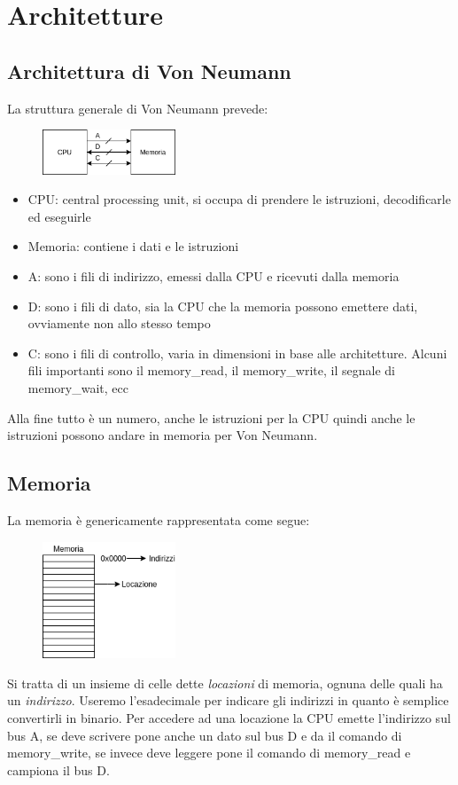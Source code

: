 \section{Architetture}

\subsection{Architettura di Von Neumann}
La struttura generale di Von Neumann prevede:

\begin{figure}[H]
    \centering
    \includegraphics[width=150px]{images/2_Architetture/Von_Neumann.png}
\end{figure}

\begin{itemize}
    \item CPU: central processing unit, si occupa di prendere le istruzioni, decodificarle ed eseguirle
    \item Memoria: contiene i dati e le istruzioni
    \item A: sono i fili di indirizzo, emessi dalla CPU e ricevuti dalla memoria
    \item D: sono i fili di dato, sia la CPU che la memoria possono emettere dati, ovviamente non allo stesso tempo
    \item C: sono i fili di controllo, varia in dimensioni in base alle architetture. Alcuni fili importanti sono il memory\_read, il memory\_write, il segnale di memory\_wait, ecc
\end{itemize}

Alla fine tutto è un numero, anche le istruzioni per la CPU quindi anche le istruzioni possono andare in memoria per Von Neumann.

\subsection{Memoria}
La memoria è genericamente rappresentata come segue:
\begin{figure}[H]
    \centering
    \includegraphics[width=150px]{images/2_Architetture/Memoria.png}
\end{figure}
Si tratta di un insieme di celle dette \emph{locazioni} di memoria, ognuna delle quali ha un \emph{indirizzo}.
Useremo l'esadecimale per indicare gli indirizzi in quanto è semplice convertirli in binario.
Per accedere ad una locazione la CPU emette l'indirizzo sul bus A, se deve scrivere pone anche un dato sul bus D e da il comando di memory\_write, se invece deve leggere pone il comando di memory\_read e campiona il bus D.

